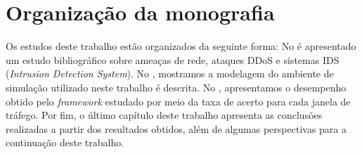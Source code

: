 \section{Organização da monografia}
Os estudos deste trabalho estão organizados da seguinte forma: No  é apresentado um estudo bibliográfico sobre ameaças de rede, ataques DDoS e sistemas IDS (\textit{Intrusion Detection System}). No , mostramos a modelagem do ambiente de simulação utilizado neste trabalho é descrita. No , apresentamos o desempenho obtido pelo \textit{framework} estudado por meio da taxa de acerto para cada janela de tráfego. Por fim, o último capítulo deste trabalho apresenta as conclusões realizadas a partir dos resultados obtidos, além de algumas perspectivas para a continuação deste trabalho. 